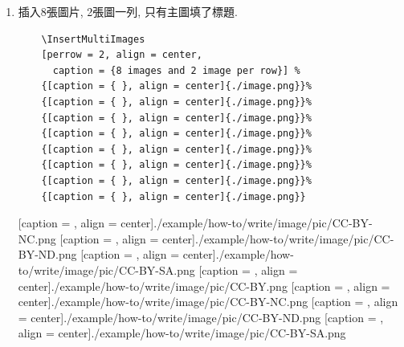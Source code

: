 \begin{enumerate}
  \newpage
  \item
  {
    插入8張圖片, 2張圖一列, 只有主圖填了標題.\\
    \begin{verbatim}
    \InsertMultiImages
    [perrow = 2, align = center,
      caption = {8 images and 2 image per row}] %
    {[caption = { }, align = center]{./image.png}}%
    {[caption = { }, align = center]{./image.png}}%
    {[caption = { }, align = center]{./image.png}}%
    {[caption = { }, align = center]{./image.png}}%
    {[caption = { }, align = center]{./image.png}}%
    {[caption = { }, align = center]{./image.png}}%
    {[caption = { }, align = center]{./image.png}}%
    {[caption = { }, align = center]{./image.png}}
    \end{verbatim}

    {[caption = { }, align = center]{./example/how-to/write/image/pic/CC-BY-NC.png}}%
    {[caption = { }, align = center]{./example/how-to/write/image/pic/CC-BY-ND.png}}%
    {[caption = { }, align = center]{./example/how-to/write/image/pic/CC-BY-SA.png}}%
    {[caption = { }, align = center]{./example/how-to/write/image/pic/CC-BY.png}}%
    {[caption = { }, align = center]{./example/how-to/write/image/pic/CC-BY-NC.png}}%
    {[caption = { }, align = center]{./example/how-to/write/image/pic/CC-BY-ND.png}}%
    {[caption = { }, align = center]{./example/how-to/write/image/pic/CC-BY-SA.png}}
  } %
  \end{enumerate}

\EndChapter
